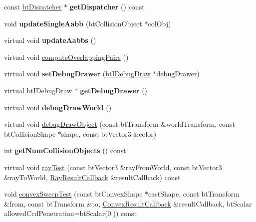 \begin{DoxyCompactItemize}
const \hyperlink{classbtDispatcher}{bt\+Dispatcher} $\ast$ {\bfseries get\+Dispatcher} () const
\item 
\mbox{\label{classbtCollisionWorld_a47cc9f4005a5de0c0aff85637943a495}} 
void {\bfseries update\+Single\+Aabb} (bt\+Collision\+Object $\ast$col\+Obj)
\item 
\mbox{\label{classbtCollisionWorld_a022960475a5721bcc94145cf84fdcb0f}} 
virtual void {\bfseries update\+Aabbs} ()
\item 
virtual void \hyperlink{classbtCollisionWorld_afb32fb7ecb40aa6247fd3df18ba81098}{compute\+Overlapping\+Pairs} ()
\item 
\mbox{\label{classbtCollisionWorld_a5a36450fa77f61d62952d3625cf54287}} 
virtual void {\bfseries set\+Debug\+Drawer} (\hyperlink{classbtIDebugDraw}{bt\+I\+Debug\+Draw} $\ast$debug\+Drawer)
\item 
\mbox{\label{classbtCollisionWorld_a68669563c969bedaab6b1a1a073b1507}} 
virtual \hyperlink{classbtIDebugDraw}{bt\+I\+Debug\+Draw} $\ast$ {\bfseries get\+Debug\+Drawer} ()
\item 
\mbox{\label{classbtCollisionWorld_a17103cf11c455d6294ca022f046a412b}} 
virtual void {\bfseries debug\+Draw\+World} ()
\item 
virtual void \hyperlink{classbtCollisionWorld_ac1ca6489c220005798069152c3df0d08}{debug\+Draw\+Object} (const bt\+Transform \&world\+Transform, const bt\+Collision\+Shape $\ast$shape, const bt\+Vector3 \&color)
\item 
\mbox{\label{classbtCollisionWorld_a6d4cc6533d174d1ae57d4907cdcf227e}} 
int {\bfseries get\+Num\+Collision\+Objects} () const
\item 
virtual void \hyperlink{classbtCollisionWorld_a01fb1f5ff8a93c11f0c6837d225ae4b7}{ray\+Test} (const bt\+Vector3 \&ray\+From\+World, const bt\+Vector3 \&ray\+To\+World, \hyperlink{structbtCollisionWorld_1_1RayResultCallback}{Ray\+Result\+Callback} \&result\+Callback) const
\item 
void \hyperlink{classbtCollisionWorld_a8dcdf201fe1c98c633682cf3845d237f}{convex\+Sweep\+Test} (const bt\+Convex\+Shape $\ast$cast\+Shape, const bt\+Transform \&from, const bt\+Transform \&to, \hyperlink{structbtCollisionWorld_1_1ConvexResultCallback}{Convex\+Result\+Callback} \&result\+Callback, bt\+Scalar allowed\+Ccd\+Penetration=bt\+Scalar(0.)) const

\end{DoxyCompactItemize}

